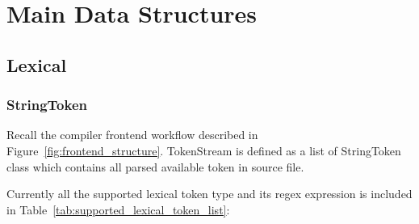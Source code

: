 \documentclass{report}
\newcommand{\+}{}
\begin{document}
    \section{Main Data Structures}\label{sec:main-data-structures}

    \subsection{Lexical}\label{subsec:lexical2}

    \subsubsection{StringToken }
    Recall the compiler frontend workflow described in Figure~\ref{fig:frontend_structure}. TokenStream is defined as
    a list of StringToken class which contains all parsed available token in source file.\par
    Currently all the supported lexical token type and its regex expression is included in Table~\ref{tab:supported_lexical_token_list}: \par
\end{document}
